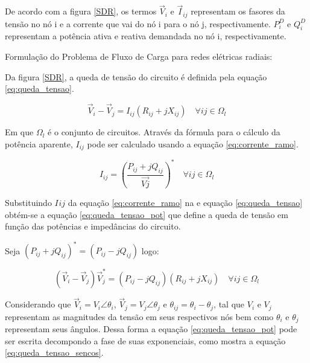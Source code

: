 De acordo com a figura \ref{SDR}, os termos $\Vec{V}_{i}$ e $\Vec{I}_{ij}$ representam os fasores da tensão no nó i e a corrente que vai do nó i para o nó j, respectivamente. 
$P_{i}^{D}$ e $Q_{i}^{D}$ representam a potência ativa e reativa demandada no nó i, respectivamente.

Formulação do Problema de Fluxo de Carga para redes elétricas radiais:

Da figura \ref{SDR}, a queda de tensão do circuito é definida pela equação \ref{eq:queda_tensao}.

\begin{equation}
    \Vec{V}_{i} - \Vec{V}_{j} = I_{ij}(R_{ij} + jX_{ij})\quad\forall ij \in \Omega_{l}
    \label{eq:queda_tensao}
\end{equation}

Em que $\Omega_{l}$ é o conjunto de circuitos. %
Através da fórmula para o cálculo da potência aparente, $I_{ij}$ pode ser calculado usando a equação \ref{eq:corrente_ramo}.

\begin{equation}
    I_{ij} = \left(\frac{P_{ij} + jQ_{ij}}{\Vec{Vj}}\right)^{*}\quad\forall ij \in \Omega_{l}
    \label{eq:corrente_ramo}
\end{equation}


Substituindo $I_{}ij$ da equação \ref{eq:corrente_ramo} na e equação \ref{eq:queda_tensao} obtém-se a equação \ref{eq:queda_tensao_pot} que define a queda de tensão em função das potências e impedâncias do circuito.

Seja $(P_{ij} + jQ_{ij})^{*} = (P_{ij} - jQ_{ij})$ logo:

\begin{equation}
    (\Vec{V}_{i} - \Vec{V}_{j})\Vec{V}_{j}^{*} = (P_{ij} - jQ_{ij})(R_{ij} + jX_{ij}) \quad\forall ij \in \Omega_{l}
    \label{eq:queda_tensao_pot}
\end{equation}

Considerando que $\Vec{V}_{i} = V_{i}\angle{\theta_{i}}$, $\Vec{V}_{j} = V_{j}\angle{\theta_{j}}$ e $\theta_{ij} = \theta_{i} - \theta_{j}$, tal que  $V_{i}$ e $V_{j}$ representam as magnitudes da tensão em seus respectivos nós bem como $\theta_{i}$ e $\theta_{j}$ representam seus ângulos.
Dessa forma a equação \ref{eq:queda_tensao_pot} pode ser escrita decompondo a fase de suas exponenciais, como mostra a equação \ref{eq:queda_tensao_sencos}.

